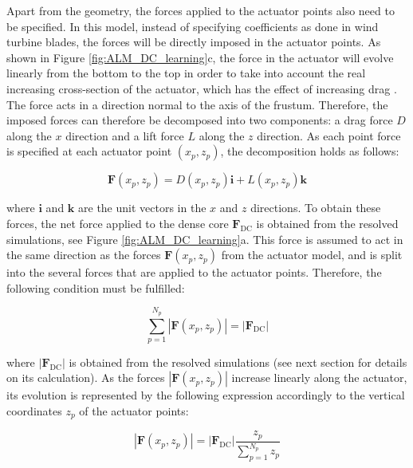 Apart from the geometry, the forces applied to the actuator points also need to be specified. In this model, instead of specifying coefficients as done in wind turbine blades, the forces will be directly imposed in the actuator points. As shown in Figure \ref{fig:ALM_DC_learning}c, the force in the actuator will evolve linearly from the bottom to the top in order to take into account the real increasing cross-section of the actuator, which has the effect of increasing drag . The force acts in a direction normal to the axis of the frustum. Therefore, the imposed forces can therefore be decomposed into two components: a drag force $D$ along the $x$ direction and a lift force $L$ along the $z$ direction. As each point force is specified at each actuator point $\left( x_p, z_p \right)$, the decomposition holds as follows:

\begin{equation}
\textbf{F} \left( x_p, z_p \right) = D \left( x_p, z_p \right) \textbf{i} + L \left( x_p, z_p \right) \textbf{k} 
\end{equation}

where $\textbf{i}$ and $\textbf{k}$ are the unit vectors in the $x$ and $z$ directions. To obtain these forces, the net force applied to the dense core $\textbf{F}_\mathrm{DC}$ is obtained from the resolved simulations, see Figure \ref{fig:ALM_DC_learning}a. This force is assumed to act in the same direction as the forces $\textbf{F} \left( x_p, z_p \right)$ from the actuator model, and is split into the several forces that are applied to the actuator points. Therefore, the following condition must be fulfilled:

\begin{equation}
\sum_{p=1}^{N_p} | \textbf{F} \left( x_p, z_p \right)| = | \textbf{F}_\mathrm{DC} |
\end{equation}

where $| \textbf{F}_\mathrm{DC} |$ is obtained from the resolved simulations (see next section for details on its calculation). As the forces $| \textbf{F} \left( x_p, z_p \right)|$ increase linearly along the actuator, its evolution is represented by the following expression accordingly to the vertical coordinates $z_p$ of the actuator points:

\begin{equation}
|\textbf{F} \left( x_p, z_p \right) | = | \textbf{F}_\mathrm{DC} | \frac{z_p}{\sum_{p=1}^{N_p} z_p}
\end{equation}

